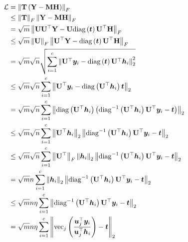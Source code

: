 \documentclass{article} %
\begin{document}
\begin{equation}
	\begin{aligned}
		{\mathcal{L}}&=\left\|{\mathbf{T}}\left({\mathbf{Y}}-{\mathbf{M}}{\mathbf{H}}\right)\right\|_F\\
		&\leq\left\|{\mathbf{T}}\right\|_F\left\|{\mathbf{Y}}-{\mathbf{M}}{\mathbf{H}}\right\|_F\\
		&=\sqrt{m}\left\|{\mathbf{U}}{\mathbf{U}}^{\top}{\mathbf{Y}}-{\mathbf{U}}\mathrm{diag}\left({\bm{t}}\right){\mathbf{U}}^{\top}{\mathbf{H}}\right\|_F\\
		&\leq\sqrt{m}\left\|{\mathbf{U}}\right\|_F\left\|{\mathbf{U}}^{\top}{\mathbf{Y}}-\mathrm{diag}\left({\bm{t}}\right){\mathbf{U}}^{\top}{\mathbf{H}}\right\|_F\\
		&=\sqrt{m}\sqrt{n}\sqrt{\sum_{i=1}^c\left\|{\mathbf{U}}^{\top}{\bm{y}}_i-\mathrm{diag}\left({\bm{t}}\right){\mathbf{U}}^{\top}{\bm{h}}_i\right\|^2_2}\\
		&\leq\sqrt{m}\sqrt{n}\sum_{i=1}^c\left\|{\mathbf{U}}^{\top}{\bm{y}}_i-\mathrm{diag}\left({\mathbf{U}}^{\top}{\bm{h}}_i\right){\bm{t}}\right\|_2\\
		&=\sqrt{m}\sqrt{n}\sum_{i=1}^c\left\|\mathrm{diag}\left({\mathbf{U}}^{\top}{\bm{h}}_i\right)\left(\mathrm{diag}^{-1}\left({\mathbf{U}}^{\top}{\bm{h}}_i\right){\mathbf{U}}^{\top}{\bm{y}}_i-{\bm{t}}\right)\right\|_2\\
		&\leq\sqrt{m}\sqrt{n}\sum_{i=1}^c\left\|{\mathbf{U}}^{\top}{\bm{h}}_i\right\|_2\left\|\mathrm{diag}^{-1}\left({\mathbf{U}}^{\top}{\bm{h}}_i\right){\mathbf{U}}^{\top}{\bm{y}}_i-{\bm{t}}\right\|_2\\
		&\leq\sqrt{m}\sqrt{n}\sum_{i=1}^c\left\|{\mathbf{U}}^{\top}\right\|_F\left\|{\bm{h}}_i\right\|_2\left\|\mathrm{diag}^{-1}\left({\mathbf{U}}^{\top}{\bm{h}}_i\right){\mathbf{U}}^{\top}{\bm{y}}_i-{\bm{t}}\right\|_2\\
		&=\sqrt{m}n\sum_{i=1}^c\left\|{\bm{h}}_i\right\|_2\left\|\mathrm{diag}^{-1}\left({\mathbf{U}}^{\top}{\bm{h}}_i\right){\mathbf{U}}^{\top}{\bm{y}}_i-{\bm{t}}\right\|_2\\
		&\leq\sqrt{m}n\eta\sum_{i=1}^c\left\|\mathrm{diag}^{-1}\left({\mathbf{U}}^{\top}{\bm{h}}_i\right){\mathbf{U}}^{\top}{\bm{y}}_i-{\bm{t}}\right\|_2\\
		&=\sqrt{m}n\eta\sum_{i=1}^c\left\|\mathrm{vec}_j\left(\frac{{\bm{u}}_j^{\top}{\bm{y}}_i}{{\bm{u}}_j^{\top}{\bm{h}}_i}\right)-{\bm{t}}\right\|_2
	\end{aligned}
\end{equation}
\end{document}

